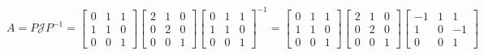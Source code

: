 \documentclass[a3paper,14pt]{extarticle}
\begin{document}
$$A=P\mathcal{J}P^{-1}=\begin{bmatrix}
    0 & 1 & 1 \\ 1 & 1 & 0 \\ 0 & 0 & 1
\end{bmatrix}\begin{bmatrix}
    2 & 1 & 0 \\ 0 & 2 & 0 \\ 0 & 0 & 1
\end{bmatrix}\begin{bmatrix}
    0 & 1 & 1 \\ 1 & 1 & 0 \\ 0 & 0 & 1
\end{bmatrix}^{-1} = \begin{bmatrix}
    0 & 1 & 1 \\ 1 & 1 & 0 \\ 0 & 0 & 1
\end{bmatrix}\begin{bmatrix}
    2 & 1 & 0 \\ 0 & 2 & 0 \\ 0 & 0 & 1
\end{bmatrix}\begin{bmatrix}
    -1 & 1 & 1 \\ 1 & 0 & -1 \\ 0 & 0 & 1
\end{bmatrix}$$
\end{document}

